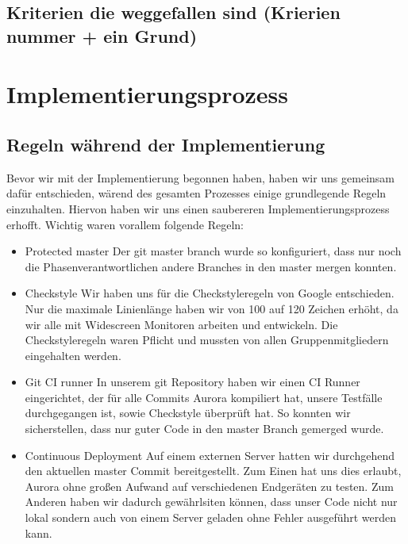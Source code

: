 \documentclass[parskip=full,11pt,twoside]{scrartcl}
\begin{document}
\subsection{Kriterien die weggefallen sind (Krierien nummer + ein Grund)}
\newpage

\section{Implementierungsprozess}
\subsection{Regeln während der Implementierung}
Bevor wir mit der Implementierung begonnen haben, haben wir uns gemeinsam dafür entschieden, wärend des gesamten Prozesses einige grundlegende Regeln einzuhalten.
Hiervon haben wir uns einen saubereren Implementierungsprozess erhofft.
Wichtig waren vorallem folgende Regeln:
\begin{itemize}
    \item Protected master
        \newline
        Der git master branch wurde so konfiguriert, dass nur noch die Phasenverantwortlichen andere Branches in den master mergen konnten. 
    \item Checkstyle
    \newline
    Wir haben uns für die Checkstyleregeln von Google entschieden. Nur die maximale Linienlänge haben wir von 100 auf 120 Zeichen erhöht, da wir alle mit Widescreen Monitoren arbeiten und entwickeln. Die Checkstyleregeln waren Pflicht und mussten von allen Gruppenmitgliedern eingehalten werden.
    \item Git CI runner
        \newline
        In unserem git Repository haben wir einen CI Runner eingerichtet, der für alle Commits Aurora kompiliert hat, unsere Testfälle durchgegangen ist, sowie Checkstyle überprüft hat.
        So konnten wir sicherstellen, dass nur guter Code in den master Branch gemerged wurde.
    \item Continuous Deployment
        \newline
        Auf einem externen Server hatten wir durchgehend den aktuellen master Commit bereitgestellt.
        Zum Einen hat uns dies erlaubt, Aurora ohne großen Aufwand auf verschiedenen Endgeräten zu testen.
        Zum Anderen haben wir dadurch gewährlsiten können, dass unser Code nicht nur lokal sondern auch von einem Server geladen ohne Fehler ausgeführt werden kann.        
\end{itemize}
\end{document}
